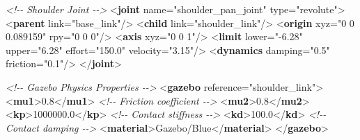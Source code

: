 \documentclass[
]{article}
\newenvironment{Shaded}{\begin{snugshade}}{\end{snugshade}}
\newcommand{\CommentTok}[1]{\textcolor[rgb]{0.56,0.35,0.01}{\textit{#1}}}
\newcommand{\KeywordTok}[1]{\textcolor[rgb]{0.13,0.29,0.53}{\textbf{#1}}}
\newcommand{\NormalTok}[1]{#1}
\newcommand{\OtherTok}[1]{\textcolor[rgb]{0.56,0.35,0.01}{#1}}
\newcommand{\StringTok}[1]{\textcolor[rgb]{0.31,0.60,0.02}{#1}}
\begin{document}
\begin{Shaded}
\begin{Highlighting}[]
  \CommentTok{\textless{}!{-}{-} Shoulder Joint {-}{-}\textgreater{}}
\NormalTok{  \textless{}}\KeywordTok{joint}\OtherTok{ name=}\StringTok{"shoulder\_pan\_joint"}\OtherTok{ type=}\StringTok{"revolute"}\NormalTok{\textgreater{}}
\NormalTok{    \textless{}}\KeywordTok{parent}\OtherTok{ link=}\StringTok{"base\_link"}\NormalTok{/\textgreater{}}
\NormalTok{    \textless{}}\KeywordTok{child}\OtherTok{ link=}\StringTok{"shoulder\_link"}\NormalTok{/\textgreater{}}
\NormalTok{    \textless{}}\KeywordTok{origin}\OtherTok{ xyz=}\StringTok{"0 0 0.089159"}\OtherTok{ rpy=}\StringTok{"0 0 0"}\NormalTok{/\textgreater{}}
\NormalTok{    \textless{}}\KeywordTok{axis}\OtherTok{ xyz=}\StringTok{"0 0 1"}\NormalTok{/\textgreater{}}
\NormalTok{    \textless{}}\KeywordTok{limit}\OtherTok{ lower=}\StringTok{"{-}6.28"}\OtherTok{ upper=}\StringTok{"6.28"}\OtherTok{ effort=}\StringTok{"150.0"}\OtherTok{ velocity=}\StringTok{"3.15"}\NormalTok{/\textgreater{}}
\NormalTok{    \textless{}}\KeywordTok{dynamics}\OtherTok{ damping=}\StringTok{"0.5"}\OtherTok{ friction=}\StringTok{"0.1"}\NormalTok{/\textgreater{}}
\NormalTok{  \textless{}/}\KeywordTok{joint}\NormalTok{\textgreater{}}

  \CommentTok{\textless{}!{-}{-} Gazebo Physics Properties {-}{-}\textgreater{}}
\NormalTok{  \textless{}}\KeywordTok{gazebo}\OtherTok{ reference=}\StringTok{"shoulder\_link"}\NormalTok{\textgreater{}}
\NormalTok{    \textless{}}\KeywordTok{mu1}\NormalTok{\textgreater{}0.8\textless{}/}\KeywordTok{mu1}\NormalTok{\textgreater{}  }\CommentTok{\textless{}!{-}{-} Friction coefficient {-}{-}\textgreater{}}
\NormalTok{    \textless{}}\KeywordTok{mu2}\NormalTok{\textgreater{}0.8\textless{}/}\KeywordTok{mu2}\NormalTok{\textgreater{}}
\NormalTok{    \textless{}}\KeywordTok{kp}\NormalTok{\textgreater{}1000000.0\textless{}/}\KeywordTok{kp}\NormalTok{\textgreater{}  }\CommentTok{\textless{}!{-}{-} Contact stiffness {-}{-}\textgreater{}}
\NormalTok{    \textless{}}\KeywordTok{kd}\NormalTok{\textgreater{}100.0\textless{}/}\KeywordTok{kd}\NormalTok{\textgreater{}  }\CommentTok{\textless{}!{-}{-} Contact damping {-}{-}\textgreater{}}
\NormalTok{    \textless{}}\KeywordTok{material}\NormalTok{\textgreater{}Gazebo/Blue\textless{}/}\KeywordTok{material}\NormalTok{\textgreater{}}
\NormalTok{  \textless{}/}\KeywordTok{gazebo}\NormalTok{\textgreater{}}


\end{Highlighting}
\end{Shaded}
\end{document}
